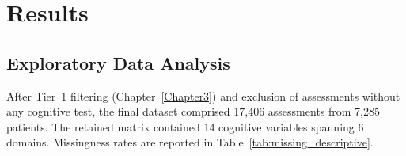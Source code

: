 
\chapter{Results}\label{Chapter4}


\section{Exploratory Data Analysis}

After Tier~1 filtering (Chapter~\ref{Chapter3}) and exclusion of assessments without any cognitive test, the final dataset comprised 17{,}406 assessments from 7{,}285 patients. The retained matrix contained 14 cognitive variables spanning 6 domains. Missingness rates are reported in Table~\ref{tab:missing_descriptive}.


